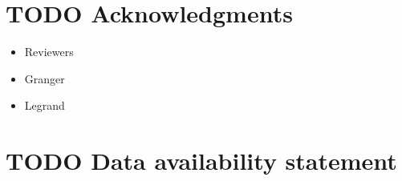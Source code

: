 \documentclass[review, 3p]{elsarticle}
\begin{document}
\section*{{\bfseries\sffamily TODO} Acknowledgments}
\label{sec:org21fac4e}
\begin{itemize}
\item Reviewers
\item Granger
\item Legrand
\end{itemize}

\section*{{\bfseries\sffamily TODO} Data availability statement}
\label{sec:orgf117676}


\end{document}
